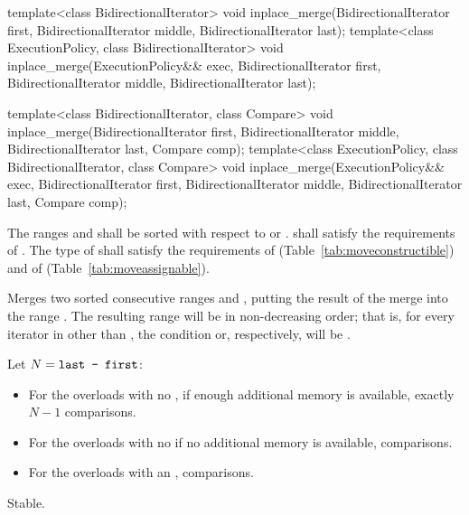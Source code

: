 %
\begin{itemdecl}
template<class BidirectionalIterator>
  void inplace_merge(BidirectionalIterator first,
                     BidirectionalIterator middle,
                     BidirectionalIterator last);
template<class ExecutionPolicy, class BidirectionalIterator>
  void inplace_merge(ExecutionPolicy&& exec,
                     BidirectionalIterator first,
                     BidirectionalIterator middle,
                     BidirectionalIterator last);

template<class BidirectionalIterator, class Compare>
  void inplace_merge(BidirectionalIterator first,
                     BidirectionalIterator middle,
                     BidirectionalIterator last, Compare comp);
template<class ExecutionPolicy, class BidirectionalIterator, class Compare>
  void inplace_merge(ExecutionPolicy&& exec,
                     BidirectionalIterator first,
                     BidirectionalIterator middle,
                     BidirectionalIterator last, Compare comp);
\end{itemdecl}

\begin{itemdescr}
\pnum
\requires
The ranges  and  shall be
sorted with respect to  or .
 shall satisfy the requirements of
. The type
of  shall satisfy the requirements of
 (Table~\ref{tab:moveconstructible}) and of
 (Table~\ref{tab:moveassignable}).

\pnum
\effects
Merges two sorted consecutive ranges
and
,
putting the result of the merge into the range
.
The resulting range will be in non-decreasing order;
that is, for every iterator
in
other than
,
the condition
or, respectively,
will be .

\pnum
\complexity Let $N = \texttt{last - first}$:
\begin{itemize}
\item For the overloads with no , if enough additional
memory is available, exactly $N - 1$ comparisons.
\item For the overloads with no  if no additional
memory is available,   comparisons.
\item For the overloads with an ,  comparisons.
\end{itemize}


\pnum
\remarks Stable.
\end{itemdescr}


